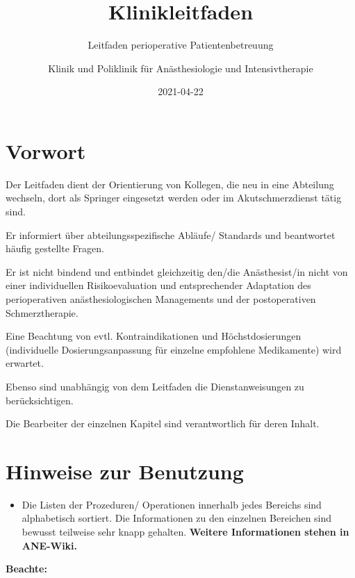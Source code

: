 \documentclass[
]{book}
\title{Klinikleitfaden}
\subtitle{Leitfaden perioperative Patientenbetreuung}
\author{Klinik und Poliklinik für Anästhesiologie und Intensivtherapie}
\date{2021-04-22}
\providecommand{\tightlist}{%
  \setlength{\itemsep}{0pt}\setlength{\parskip}{0pt}}
\begin{document}
\maketitle

{
\setcounter{tocdepth}{1}
\tableofcontents
}
\hypertarget{vorwort}{%
\chapter*{Vorwort}\label{vorwort}}

Der Leitfaden dient der Orientierung von Kollegen, die neu in eine Abteilung wechseln, dort als Springer eingesetzt werden oder im Akutschmerzdienst tätig sind.

Er informiert über abteilungsspezifische Abläufe/ Standards und beantwortet häufig gestellte Fragen.

Er ist nicht bindend und entbindet gleichzeitig den/die Anästhesist/in nicht von einer individuellen Risikoevaluation und entsprechender Adaptation des perioperativen anästhesiologischen Managements und der postoperativen Schmerztherapie.

Eine Beachtung von evtl. Kontraindikationen und Höchstdosierungen (individuelle Dosierungsanpassung für einzelne empfohlene Medikamente) wird erwartet.

Ebenso sind unabhängig von dem Leitfaden die Dienstanweisungen zu berücksichtigen.

Die Bearbeiter der einzelnen Kapitel sind verantwortlich für deren Inhalt.

\hypertarget{hinweise-zur-benutzung}{%
\chapter*{Hinweise zur Benutzung}\label{hinweise-zur-benutzung}}

\begin{itemize}
\tightlist
\item
  Die Listen der Prozeduren/ Operationen innerhalb jedes Bereichs sind alphabetisch sortiert. Die Informationen zu den einzelnen Bereichen sind bewusst teilweise sehr knapp gehalten. \textbf{Weitere Informationen stehen in ANE-Wiki.}
\end{itemize}

\textbf{Beachte:}
\end{document}
